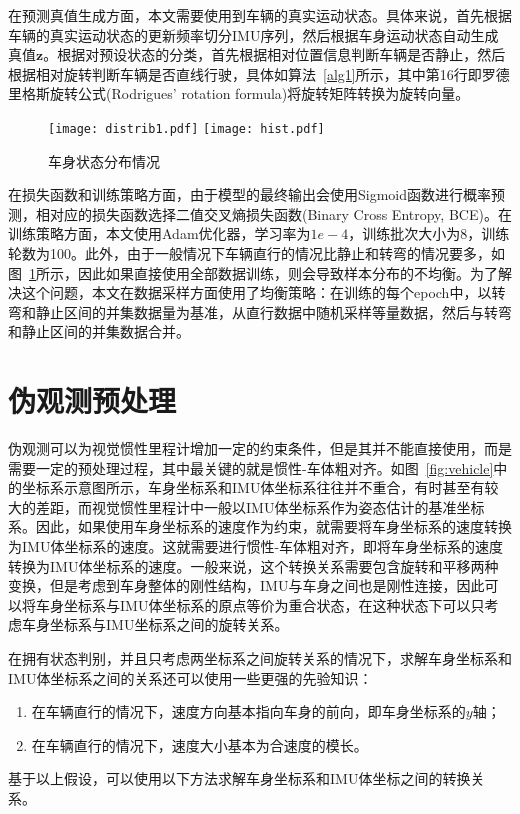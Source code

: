 在预测真值生成方面，本文需要使用到车辆的真实运动状态。具体来说，首先根据车辆的真实运动状态的更新频率切分IMU序列，然后根据车身运动状态自动生成真值$\symbf{z}$。根据对预设状态的分类，首先根据相对位置信息判断车辆是否静止，然后根据相对旋转判断车辆是否直线行驶，具体如算法~\ref{alg1}所示，其中第16行即罗德里格斯旋转公式(Rodrigues' rotation formula)\cite{dai2015euler}将旋转矩阵转换为旋转向量。

\begin{figure}
  \centering
  \texttt{[image: distrib1.pdf]}
  \texttt{[image: hist.pdf]}
  \caption{车身状态分布情况}
  \label{fig:data_distrib}
\end{figure}

在损失函数和训练策略方面，由于模型的最终输出会使用Sigmoid函数进行概率预测，相对应的损失函数选择二值交叉熵损失函数(Binary Cross Entropy, BCE)。在训练策略方面，本文使用Adam优化器\cite{kingma2014adam}，学习率为$1e-4$，训练批次大小为8，训练轮数为100。此外，由于一般情况下车辆直行的情况比静止和转弯的情况要多，如图~\ref{fig:data_distrib}所示，因此如果直接使用全部数据训练，则会导致样本分布的不均衡。为了解决这个问题，本文在数据采样方面使用了均衡策略：在训练的每个epoch中，以转弯和静止区间的并集数据量为基准，从直行数据中随机采样等量数据，然后与转弯和静止区间的并集数据合并。

\section{伪观测预处理}

伪观测可以为视觉惯性里程计增加一定的约束条件，但是其并不能直接使用，而是需要一定的预处理过程，其中最关键的就是惯性-车体粗对齐。如图~\ref{fig:vehicle}中的坐标系示意图所示，车身坐标系和IMU体坐标系往往并不重合，有时甚至有较大的差距，而视觉惯性里程计中一般以IMU体坐标系作为姿态估计的基准坐标系。因此，如果使用车身坐标系的速度作为约束，就需要将车身坐标系的速度转换为IMU体坐标系的速度。这就需要进行惯性-车体粗对齐，即将车身坐标系的速度转换为IMU体坐标系的速度。一般来说，这个转换关系需要包含旋转和平移两种变换，但是考虑到车身整体的刚性结构，IMU与车身之间也是刚性连接，因此可以将车身坐标系与IMU体坐标系的原点等价为重合状态，在这种状态下可以只考虑车身坐标系与IMU坐标系之间的旋转关系。

在拥有状态判别，并且只考虑两坐标系之间旋转关系的情况下，求解车身坐标系和IMU体坐标系之间的关系还可以使用一些更强的先验知识：
\begin{enumerate}
  \item 在车辆直行的情况下，速度方向基本指向车身的前向，即车身坐标系的$y$轴；
  \item 在车辆直行的情况下，速度大小基本为合速度的模长。
\end{enumerate}
基于以上假设，可以使用以下方法求解车身坐标系和IMU体坐标之间的转换关系。

